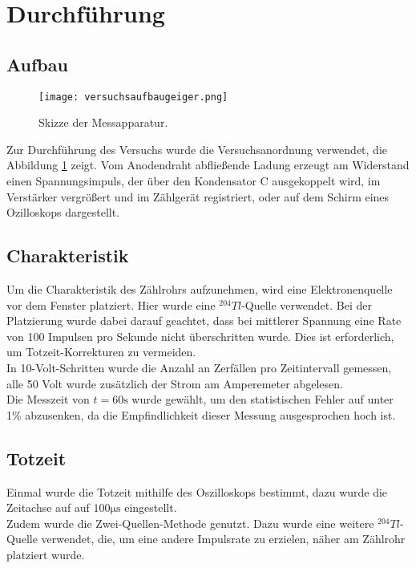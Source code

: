 \section{Durchführung}
\label{sec:Durchführung}

\subsection{Aufbau}
\begin{figure}
 \centering
 \texttt{[image: versuchsaufbaugeiger.png]}
 \label{fig:aufbauversuch}
 \caption{Skizze der Messapparatur.}
\end{figure}

\noindent Zur Durchführung des Versuchs wurde die Versuchsanordnung verwendet,
die Abbildung \ref{fig:aufbauversuch} zeigt. Vom Anodendraht abfließende Ladung
erzeugt am Widerstand einen Spannungsimpuls, der über den Kondensator C ausgekoppelt wird,
im Verstärker vergrößert und im Zählgerät registriert, oder auf dem Schirm
eines Ozilloskops dargestellt.\\

\subsection{Charakteristik}
Um die Charakteristik des Zählrohrs aufzunehmen, wird eine Elektronenquelle vor dem
Fenster platziert. Hier wurde eine $^204Tl$-Quelle verwendet. Bei der Platzierung
wurde dabei darauf geachtet, dass bei mittlerer Spannung eine Rate von
100 Impulsen pro Sekunde nicht überschritten wurde. Dies ist erforderlich,
um Totzeit-Korrekturen zu vermeiden. \\
In 10-Volt-Schritten wurde die Anzahl an Zerfällen pro Zeitintervall gemessen, alle 
50 Volt wurde zusätzlich der Strom am Amperemeter abgelesen.\\
Die Messzeit von $t = 60\si{\s}$ wurde gewählt, um den statistischen Fehler
auf unter 1\% abzusenken, da die Empfindlichkeit dieser Messung ausgesprochen
hoch ist. 

\subsection{Totzeit}
Einmal wurde die Totzeit mithilfe des Oszilloskops bestimmt, dazu wurde 
die Zeitachse auf auf $100 \si{\micro\s}$ eingestellt.\\
Zudem wurde die Zwei-Quellen-Methode genutzt. Dazu wurde eine weitere
$^204 Tl$-Quelle verwendet, die, um eine andere Impulsrate zu erzielen,
näher am Zählrohr platziert wurde. 